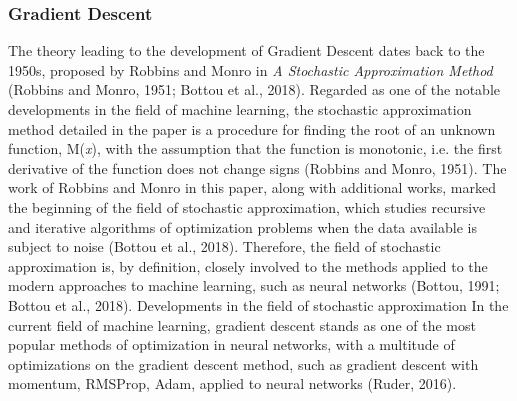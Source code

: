 \documentclass[11pt]{article}
\begin{document}
\subsubsection{Gradient Descent}
The theory leading to the development of Gradient Descent dates back to the 1950s, proposed by Robbins and Monro in \textit{A Stochastic Approximation Method} (Robbins and Monro, 1951; Bottou et al., 2018). Regarded as one of the notable developments in the field of machine learning, the stochastic approximation method detailed in the paper is a procedure for finding the root of an unknown function, M(\textit{x}), with the assumption that the function is monotonic, i.e. the first derivative of the function does not change signs (Robbins and Monro, 1951). The work of Robbins and Monro in this paper, along with additional works, marked the beginning of the field of stochastic approximation, which studies recursive and iterative algorithms of optimization problems when the data available is subject to noise (Bottou et al., 2018). Therefore, the field of stochastic approximation is, by definition, closely involved to the methods applied to the modern approaches to machine learning, such as neural networks (Bottou, 1991; Bottou et al., 2018). Developments in the field of stochastic approximation  In the current field of machine learning, gradient descent stands as one of the most popular methods of optimization in neural networks, with a multitude of optimizations on the gradient descent method, such as gradient descent with momentum, RMSProp, Adam, applied to neural networks (Ruder, 2016).\par
\end{document}
